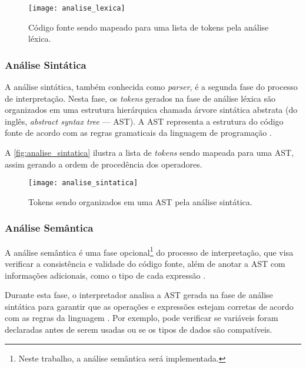 \begin{figure}[H]
	\centering
	\texttt{[image: analise\_lexica]}
	\caption{Código fonte sendo mapeado para uma lista de tokens pela análise léxica.}
	\label{fig:analise_lexica}
\end{figure}

\subsubsection{Análise Sintática}

A análise sintática, também conhecida como \textit{parser}, é a segunda fase do processo de interpretação. Nesta fase, os \textit{tokens} gerados na fase de análise léxica são organizados em uma estrutura hierárquica chamada árvore sintática abstrata (do inglês, \textit{abstract syntax tree} — AST). A AST representa a estrutura do código fonte de acordo com as regras gramaticais da linguagem de programação \cite{craftinginterpreters}.

A \autoref{fig:analise_sintatica} ilustra a lista de \textit{tokens} sendo mapeada para uma AST, assim gerando a ordem de procedência dos operadores.

\begin{figure}[H]
	\centering
	\texttt{[image: analise\_sintatica]}
	\caption{Tokens sendo organizados em uma AST pela análise sintática.}
	\label{fig:analise_sintatica}
\end{figure}

\subsubsection{Análise Semântica}

A análise semântica é uma fase opcional\footnote{Neste trabalho, a análise semântica será implementada.} do processo de interpretação, que visa verificar a consistência e validade do código fonte, além de anotar a AST com informações adicionais, como o tipo de cada expressão \cite{craftinginterpreters}.

Durante esta fase, o interpretador analisa a AST gerada na fase de análise sintática para garantir que as operações e expressões estejam corretas de acordo com as regras da linguagem \cite{craftinginterpreters}. Por exemplo, pode verificar se variáveis foram declaradas antes de serem usadas ou se os tipos de dados são compatíveis.

